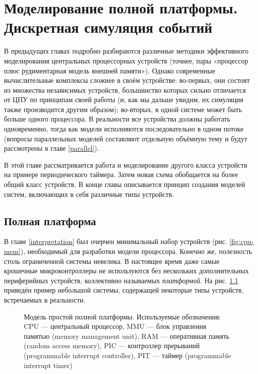 \chapter[Моделирование полной платформы]{Моделирование полной платформы. Дискретная симуляция событий}\label{fullplatform}


В предыдущих главах подробно разбираются различные методики эффективного моделирования центральных процессорных устройств (точнее, пары «процессор плюс рудиментарная модель внешней памяти»). Однако современные вычислительные комплексы сложнее в своём устройстве: во-первых, они  состоят из множества независимых устройств, большинство которых сильно отличается от ЦПУ по принципам своей работы (и, как мы дальше увидим, их симуляция также производится  другим образом); во-вторых, в одной системе может быть больше одного процессора. В реальности все устройства должны работать одновременно, тогда как модели исполняются последовательно в одном потоке (вопросы параллельных моделей составляют отдельную объёмную тему и будут рассмотрены в главе \ref{parallel}).

В этой главе рассматривается работа и моделирование другого класса устройств на примере периодического таймера. Затем новая схема обобщается на более общий класс устройств. В конце главы описывается принцип создания моделей систем, включающих в себя различные типы устройств.

\section{Полная платформа}

В главе \ref{interpretation} был очерчен минимальный набор устройств (рис. \ref{fig:cpu-mem}), необходимый для разработки модели процессора. Конечно же, полезность столь ограниченной системы невелика. В настоящее время даже самые крошечные микроконтроллеры не используются без нескольких дополнительных периферийных устройств, коллективно называемых \textit{платформой}. На рис. \ref{fig:full-platform} приведён пример небольшой системы, содержащей некоторые типы устройств, встречаемых в реальности.

\begin{figure}[htp]
    \centering
    \caption[Модель простой полной платформы]{Модель простой полной платформы. Используемые обозначения: CPU — центральный процессор, MMU — блок управления памятью (\abbr memory management unit), RAM — оперативная память (\abbr random access memory), PIC — контроллер прерываний (\abbr programmable interrupt controller), PIT — таймер (\abbr programmable interrupt timer)}
    \label{fig:full-platform}
\end{figure}

